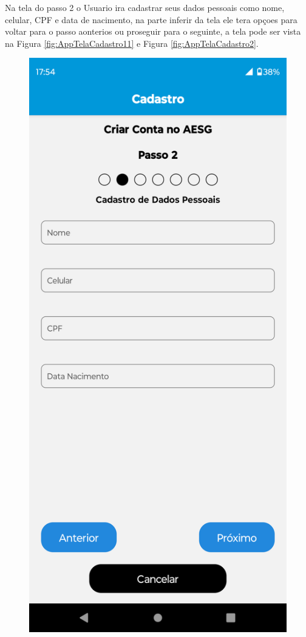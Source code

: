 \documentclass[
    12pt,                   %
    openright,              %
    oneside,                %
    a4paper,                %
    sumario=tradicional,    %
    english,                %
    brazil,                 %
    ]{abntex2}
\begin{document}
            \newpage
            
            Na tela do passo 2 o Usuario ira cadastrar seus dados pessoais como nome, celular, CPF e data de nacimento, na parte inferir da tela ele tera opçoes para voltar para o passo aonterios ou proseguir para o seguinte, a tela pode ser vista na Figura \ref{fig:AppTelaCadastro11} e Figura \ref{fig:AppTelaCadastro2}.   
            \begin{figure}[!h]          
                \begin{minipage}{0.5\textwidth}
                    \centering
                    \includegraphics[width=0.8\linewidth]{Imagens/App Images User/AUCadastro11.png}

\end{minipage}
\end{figure}
\end{document}
